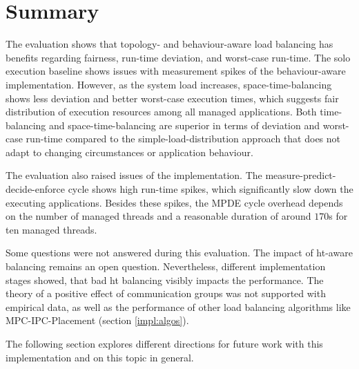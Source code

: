 \section{Summary}
\label{eval:summary}

The evaluation shows that topology- and behaviour-aware load balancing has
benefits regarding fairness, run-time deviation, and worst-case run-time.
The solo execution baseline shows issues with measurement spikes of the
behaviour-aware implementation.
However, as the system load increases, space-time-balancing shows less deviation
and better worst-case execution times, which suggests fair distribution of
execution resources among all managed applications.
Both time-balancing and space-time-balancing are superior in terms of
deviation and worst-case run-time compared to the
simple-load-distribution approach that does not adapt to changing
circumstances or application behaviour.

The evaluation also raised issues of the implementation.
The measure-predict-decide-enforce cycle shows high run-time spikes, which
significantly slow down the executing applications.
Besides these spikes, the MPDE cycle overhead depends on the number of managed
threads and a reasonable duration of around $170$\textmu{}s for ten managed
threads.

Some questions were not answered during this evaluation.
The impact of \gls{ht}-aware balancing remains an open question.
Nevertheless, different implementation stages showed, that bad \gls{ht} balancing visibly
impacts the performance.
The theory of a positive effect of communication groups was not supported with empirical
data, as well as the performance of other load balancing algorithms
like MPC-IPC-Placement (section \ref{impl:algos}).

The following section explores different directions for future work with this
implementation and on this topic in general.
